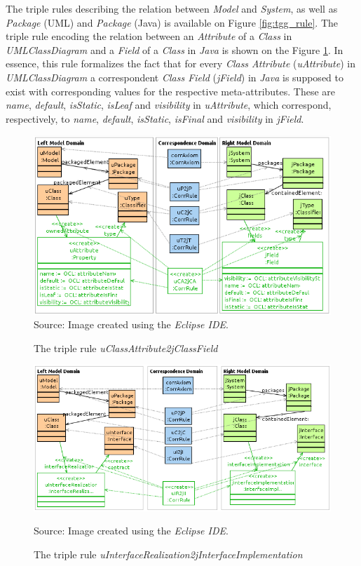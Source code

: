 \documentclass[tuberlin,cic,tc,english,noabntcite,oneside]{iiufrgs}
\begin{document}
The triple rules describing the relation between \emph{Model} and \emph{System}, as well as \emph{Package} (UML) and \emph{Package} (Java) is available on Figure \ref{fig:tgg_rule}. The triple rule encoding the relation between an \emph{Attribute} of a \emph{Class} in \emph{UMLClassDiagram} and a \emph{Field} of a \emph{Class} in \emph{Java} is shown on the Figure \ref{fig:uCAttribute2jCField}. In essence, this rule formalizes the fact that for every \emph{Class Attribute} (\emph{uAttribute}) in \emph{UMLClassDiagram} a correspondent \emph{Class Field} (\emph{jField}) in \emph{Java} is supposed to exist with corresponding values for the respective meta-attributes. These are \emph{name}, \emph{default}, \emph{isStatic}, \emph{isLeaf} and \emph{visibility} in \emph{uAttribute}, which correspond, respectively, to \emph{name}, \emph{default}, \emph{isStatic}, \emph{isFinal} and \emph{visibility} in \emph{jField}.

\begin{figure}[H]
	\centering
    \caption{The triple rule \emph{uClassAttribute2jClassField}}
    \includegraphics[width=\textwidth]{uCAttribute2jCField} \\
    Source: Image created using the \emph{Eclipse IDE}.
    \label{fig:uCAttribute2jCField}
\end{figure}

\begin{figure}[H]
	\centering
    \caption{The triple rule \emph{uInterfaceRealization2jInterfaceImplementation}}
    \includegraphics[width=\textwidth]{uIRealization2jIImplementation} \par
    Source: Image created using the \emph{Eclipse IDE}.
    \label{fig:uIRealization2jIImplementation}
\end{figure}
\end{document}
